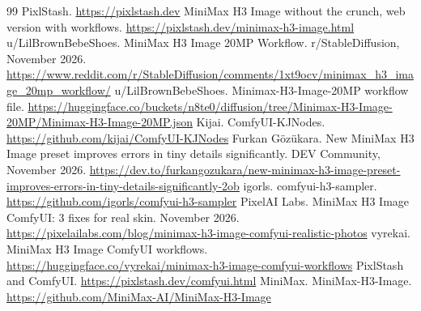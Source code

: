 \documentclass[11pt,a4paper]{article}
\begin{document}
\begin{thebibliography}{99}
\small
{} PixlStash. \url{https://pixlstash.dev}
 MiniMax H3 Image without the crunch, web version with workflows. \url{https://pixlstash.dev/minimax-h3-image.html}
 u/LilBrownBebeShoes. MiniMax H3 Image 20MP Workflow. r/StableDiffusion, November 2026. \url{https://www.reddit.com/r/StableDiffusion/comments/1xt9ocv/minimax_h3_image_20mp_workflow/}
 u/LilBrownBebeShoes. Minimax-H3-Image-20MP workflow file. \url{https://huggingface.co/buckets/n8te0/diffusion/tree/Minimax-H3-Image-20MP/Minimax-H3-Image-20MP.json}
 Kijai. ComfyUI-KJNodes. \url{https://github.com/kijai/ComfyUI-KJNodes}
 Furkan G\"oz\"ukara. New MiniMax H3 Image preset improves errors in tiny details significantly. DEV Community, November 2026. \url{https://dev.to/furkangozukara/new-minimax-h3-image-preset-improves-errors-in-tiny-details-significantly-2ob}
 igorls. comfyui-h3-sampler. \url{https://github.com/igorls/comfyui-h3-sampler}
 PixelAI Labs. MiniMax H3 Image ComfyUI: 3 fixes for real skin. November 2026. \url{https://pixelailabs.com/blog/minimax-h3-image-comfyui-realistic-photos}
 vyrekai. MiniMax H3 Image ComfyUI workflows. \url{https://huggingface.co/vyrekai/minimax-h3-image-comfyui-workflows}
 PixlStash and ComfyUI. \url{https://pixlstash.dev/comfyui.html}
 MiniMax. MiniMax-H3-Image. \url{https://github.com/MiniMax-AI/MiniMax-H3-Image}
\end{thebibliography}
\end{document}
